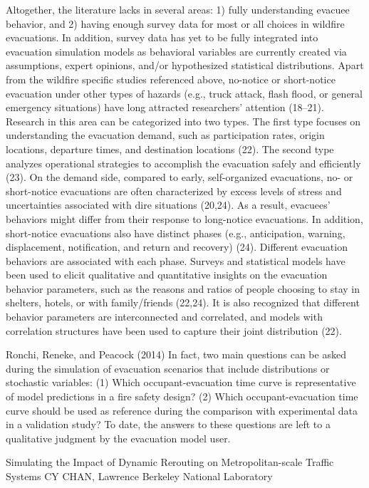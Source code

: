 Altogether, the literature lacks in several areas: 1) fully understanding evacuee behavior, and 2) having enough survey data for most or all choices in wildfire evacuations. In addition, survey data has yet to be fully integrated into evacuation simulation models as behavioral variables are currently created via assumptions, expert opinions, and/or hypothesized statistical distributions.
Apart from the wildfire specific studies referenced above, no-notice or short-notice evacuation under other types of hazards (e.g., truck attack, flash flood, or general emergency situations) have long attracted researchers’ attention (18–21). Research in this area can be categorized into two types. The first type focuses on understanding the evacuation demand, such as participation rates, origin locations, departure times, and destination locations (22). The second type analyzes operational strategies to accomplish the evacuation safely and efficiently (23). On the demand side, compared to early, self-organized evacuations, no- or short-notice evacuations are often characterized by excess levels of stress and uncertainties associated with dire situations (20,24). As a result, evacuees’ behaviors might differ from their response to long-notice evacuations. In addition, short-notice evacuations also have distinct phases (e.g., anticipation, warning, displacement, notification, and return and recovery) (24). Different evacuation behaviors are associated with each phase. Surveys and statistical models have been used to elicit qualitative and quantitative insights on the evacuation behavior parameters, such as the reasons and ratios of people choosing to stay in shelters, hotels, or with family/friends (22,24). It is also recognized that different behavior parameters are interconnected and correlated, and models with correlation structures have been used to capture their joint distribution (22).



Ronchi, Reneke, and Peacock (2014)
In fact, two main
questions can be asked during the simulation of evacuation scenarios that
include distributions or stochastic variables: (1) Which occupant-evacuation time
curve is representative of model predictions in a fire safety design? (2) Which
occupant-evacuation time curve should be used as reference during the comparison
with experimental data in a validation study? To date, the answers to these
questions are left to a qualitative judgment by the evacuation model user.



Simulating the Impact of Dynamic Rerouting on
Metropolitan-scale Traffic Systems
CY CHAN, Lawrence Berkeley National Laboratory  

